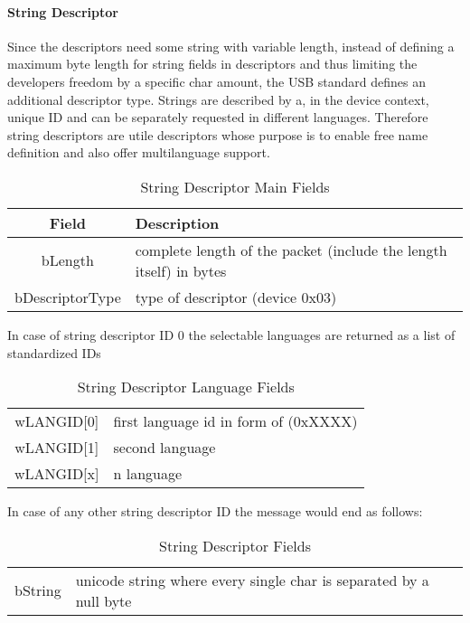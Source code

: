 \paragraph{String  Descriptor}
Since the descriptors need some string with variable length, instead of defining a maximum byte length for string fields in descriptors and thus 
limiting the developers freedom by a specific char amount, the USB standard defines an additional descriptor type. Strings are 
described by a, in the device context, unique ID and can be separately requested in  different languages. Therefore string descriptors 
are utile descriptors whose purpose is to enable free name definition and also offer multilanguage support.

\begin{table}
\begin{tabular}{c|p{10 cm}}
Field & Description \\ \hline
bLength & complete length of the packet (include the length itself) in bytes \\
bDescriptorType & type of descriptor (device 0x03)
\end{tabular}
 \caption{String Descriptor Main Fields}
\end{table}

In case of string descriptor ID 0 the selectable languages are returned as a list of standardized IDs
\begin{table}
\begin{tabular}{c|p{10 cm}}
wLANGID[0] & first language id in form of (0xXXXX) \\
wLANGID[1] & second language \\
wLANGID[x] & n language 
\end{tabular}
 \caption{String Descriptor Language Fields}
\end{table}

In case of any other string descriptor ID the  message would end as follows:
\begin{table}
\begin{tabular}{c|p{10 cm}}
bString & unicode string where every single char is separated by a null byte
\end{tabular}
 \caption{String Descriptor Fields}
\end{table}

